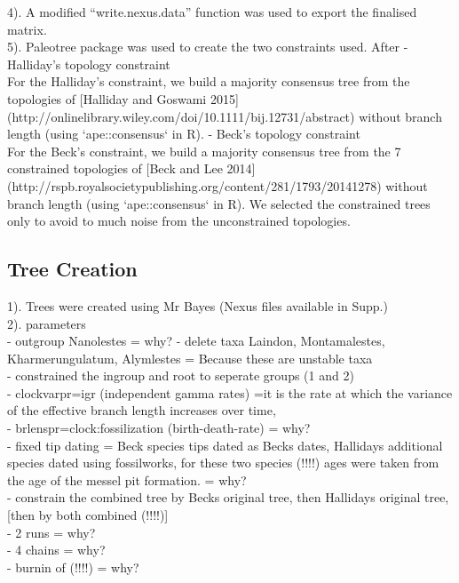 \documentclass[a4paper,11pt]{article}
\begin{document}
 4). A modified ``write.nexus.data'' function was used to export the finalised matrix.\\

 5). Paleotree package was used to create the two constraints used. After 
 - Halliday's topology constraint\\
For the Halliday's constraint, we build a majority consensus tree from the topologies of [Halliday and Goswami 2015]\\ (http://onlinelibrary.wiley.com/doi/10.1111/bij.12731/abstract) without branch length (using `ape::consensus` in R).
 - Beck's topology constraint\\
For the Beck's constraint, we build a majority consensus tree from the 7 constrained topologies of [Beck and Lee 2014]\\ (http://rspb.royalsocietypublishing.org/content/281/1793/20141278) without branch length (using `ape::consensus` in R).
We selected the constrained trees only to avoid to much noise from the unconstrained topologies.

\subsection{Tree Creation}

1). Trees were created using Mr Bayes (Nexus files available in Supp.)\\

2). parameters\\
- outgroup Nanolestes = why?
- delete taxa Laindon, Montamalestes, Kharmerungulatum, Alymlestes = Because these are unstable taxa\\
- constrained the ingroup and root to seperate groups (1 and 2)\\
- clockvarpr=igr (independent gamma rates) =it is the rate at which the variance of the effective branch length increases over time,\\
- brlenspr=clock:fossilization (birth-death-rate) = why?\\
- fixed tip dating = Beck species tips dated as Becks dates, Hallidays additional species dated using fossilworks, for these two species (!!!!) ages were taken from the age of the messel pit formation. = why?\\
- constrain the combined tree by Becks original tree, then Hallidays original tree, [then by both combined (!!!!)]\\
- 2 runs = why?\\
- 4 chains = why?\\
- burnin of (!!!!) = why?\\
\end{document}
